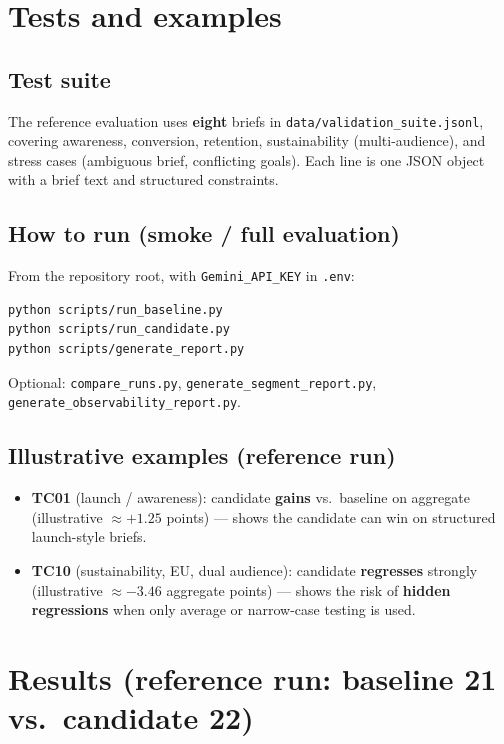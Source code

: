 \documentclass[11pt,a4paper]{article}
\begin{document}
\section{Tests and examples}

\subsection{Test suite}

The reference evaluation uses \textbf{eight} briefs in \texttt{data/validation\_suite.jsonl}, covering awareness, conversion, retention, sustainability (multi-audience), and stress cases (ambiguous brief, conflicting goals). Each line is one JSON object with a brief text and structured constraints.

\subsection{How to run (smoke / full evaluation)}

From the repository root, with \texttt{Gemini\_API\_KEY} in \texttt{.env}:

\begin{verbatim}
python scripts/run_baseline.py
python scripts/run_candidate.py
python scripts/generate_report.py
\end{verbatim}

Optional: \texttt{compare\_runs.py}, \texttt{generate\_segment\_report.py}, \texttt{generate\_observability\_report.py}.

\subsection{Illustrative examples (reference run)}

\begin{itemize}
  \item \textbf{TC01} (launch / awareness): candidate \textbf{gains} vs.\ baseline on aggregate (illustrative $\approx +1.25$ points) --- shows the candidate can win on structured launch-style briefs.
  \item \textbf{TC10} (sustainability, EU, dual audience): candidate \textbf{regresses} strongly (illustrative $\approx -3.46$ aggregate points) --- shows the risk of \textbf{hidden regressions} when only average or narrow-case testing is used.
\end{itemize}

\section{Results (reference run: baseline 21 vs.\ candidate 22)}
\end{document}
